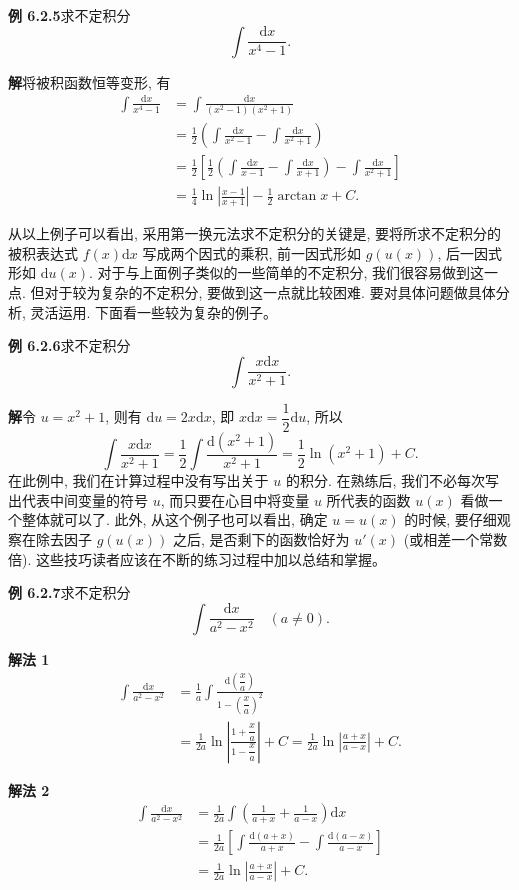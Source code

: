 \documentclass[UTF8, 12pt, fontset=fandol, oneside]{ctexart}
\begin{document}
\noindent\textbf{例 6.2.5}\quad 求不定积分
\[
  \int\frac{\mathrm dx}{x^4-1}.
\]

\noindent\textbf{解}\quad 将被积函数恒等变形, 有
\[
\begin{aligned}
  \int\frac{\mathrm dx}{x^4-1}
  &=
  \int\frac{\mathrm dx}{(x^2-1)(x^2+1)}\\
  &=
  \frac12\left(\int\frac{\mathrm dx}{x^2-1}-\int\frac{\mathrm dx}{x^2+1}\right)\\
  &=
  \frac12\left[\frac12\left(\int\frac{\mathrm dx}{x-1}-\int\frac{\mathrm dx}{x+1}\right)
  -\int\frac{\mathrm dx}{x^2+1}\right]\\
  &=
  \frac14\ln\left|\frac{x-1}{x+1}\right|-\frac12\arctan x+C.
\end{aligned}
\]

从以上例子可以看出, 采用第一换元法求不定积分的关键是, 要将所求不定积分的被积表达式 $f(x)\mathrm dx$ 写成两个因式的乘积, 前一因式形如 $g(u(x))$, 后一因式形如 $\mathrm du(x)$. 对于与上面例子类似的一些简单的不定积分, 我们很容易做到这一点. 但对于较为复杂的不定积分, 要做到这一点就比较困难. 要对具体问题做具体分析, 灵活运用. 下面看一些较为复杂的例子。

\noindent\textbf{例 6.2.6}\quad 求不定积分
\[
  \int\frac{x\mathrm dx}{x^2+1}.
\]

\noindent\textbf{解}\quad 令 $u=x^2+1$, 则有 $\mathrm du=2x\mathrm dx$, 即 $x\mathrm dx=\dfrac12\mathrm du$, 所以
\[
  \int\frac{x\mathrm dx}{x^2+1}
  =
  \frac12\int\frac{\mathrm d(x^2+1)}{x^2+1}
  =
  \frac12\ln(x^2+1)+C.
\]
在此例中, 我们在计算过程中没有写出关于 $u$ 的积分. 在熟练后, 我们不必每次写出代表中间变量的符号 $u$, 而只要在心目中将变量 $u$ 所代表的函数 $u(x)$ 看做一个整体就可以了. 此外, 从这个例子也可以看出, 确定 $u=u(x)$ 的时候, 要仔细观察在除去因子 $g(u(x))$ 之后, 是否剩下的函数恰好为 $u'(x)$ (或相差一个常数倍). 这些技巧读者应该在不断的练习过程中加以总结和掌握。

\noindent\textbf{例 6.2.7}\quad 求不定积分
\[
  \int\frac{\mathrm dx}{a^2-x^2}\quad (a\ne0).
\]

\noindent\textbf{解法 1}\quad
\[
\begin{aligned}
  \int\frac{\mathrm dx}{a^2-x^2}
  &=
  \frac1a\int\frac{\mathrm d\left(\dfrac xa\right)}{1-\left(\dfrac xa\right)^2}\\
  &=
  \frac1{2a}\ln\left|\frac{1+\dfrac xa}{1-\dfrac xa}\right|+C
  =
  \frac1{2a}\ln\left|\frac{a+x}{a-x}\right|+C.
\end{aligned}
\]

\noindent\textbf{解法 2}\quad
\[
\begin{aligned}
  \int\frac{\mathrm dx}{a^2-x^2}
  &=
  \frac1{2a}\int\left(\frac1{a+x}+\frac1{a-x}\right)\mathrm dx\\
  &=
  \frac1{2a}\left[\int\frac{\mathrm d(a+x)}{a+x}
  -\int\frac{\mathrm d(a-x)}{a-x}\right]\\
  &=
  \frac1{2a}\ln\left|\frac{a+x}{a-x}\right|+C.
\end{aligned}
\]
\end{document}
